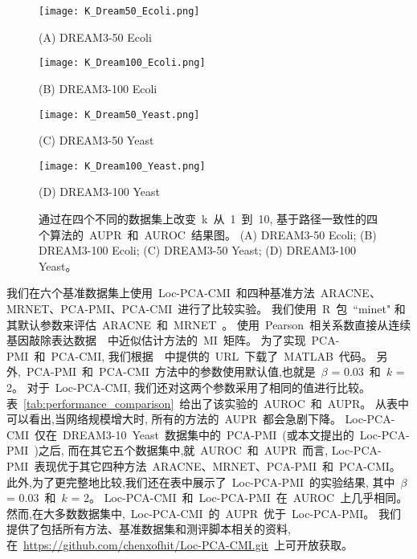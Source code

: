   \begin{figure*}[!htbp]
    \centering
    \begin{minipage}[b]{0.45\linewidth}
      \centering
      \centerline{
        \texttt{[image: K\_Dream50\_Ecoli.png]}}
      \centerline{(A) DREAM3-50 Ecoli}
      \medskip  
    \end{minipage}
    \begin{minipage}[b]{0.45\linewidth}
      \centering
      \centerline{
        \texttt{[image: K\_Dream100\_Ecoli.png]}}
      \centerline{(B) DREAM3-100 Ecoli}
      \medskip  
    \end{minipage}
      \begin{minipage}[b]{0.45\linewidth}
      \centering
      \centerline{
        \texttt{[image: K\_Dream50\_Yeast.png]}}
      \centerline{(C) DREAM3-50 Yeast}
      \medskip  
    \end{minipage}
    \begin{minipage}[b]{0.45\linewidth}
      \centering
      \centerline{
        \texttt{[image: K\_Dream100\_Yeast.png]}}
      \centerline{(D) DREAM3-100 Yeast}
      \medskip  
    \end{minipage}
    \caption{%
    通过在四个不同的数据集上改变~k~从~1~到~10, 基于路径一致性的四个算法的~AUPR~和~AUROC~结果图。
    (A) DREAM3-50 Ecoli; 
    (B) DREAM3-100 Ecoli; 
    (C) DREAM3-50 Yeast; 
    (D) DREAM3-100 Yeast。}


    \label{fig:k}
    \vspace{-0.5em}
  \end{figure*}

我们在六个基准数据集上使用~Loc-PCA-CMI~和四种基准方法~ARACNE、MRNET、PCA-PMI、PCA-CMI~进行了比较实验。
我们使用~R~包~``minet" 和其默认参数来评估~ARACNE~和~MRNET~\cite{meyer2008minet}。
使用~Pearson~相关系数直接从连续基因敲除表达数据~\cite{olsen2008impact,meyer2010information}~中近似估计方法的~MI~矩阵。
为了实现~PCA-PMI~和~PCA-CMI, 我们根据~\cite{zhang2011inferring,zhao2016part}~中提供的~URL~下载了~MATLAB~代码。
另外,~PCA-PMI~和~PCA-CMI~方法中的参数使用默认值,也就是~$\beta$ = 0.03~和~$k$ = 2。
对于~Loc-PCA-CMI, 我们还对这两个参数采用了相同的值进行比较。
表~\ref{tab:performance_comparison}~给出了该实验的~AUROC~和~AUPR。
从表中可以看出,当网络规模增大时, 所有的方法的~AUPR~都会急剧下降。
Loc-PCA-CMI~仅在~DREAM3-10~Yeast~数据集中的~PCA-PMI~(或本文提出的~Loc-PCA-PMI~)之后,
而在其它五个数据集中,就~AUROC~和~AUPR~而言,
Loc-PCA-PMI~表现优于其它四种方法~ARACNE、MRNET、PCA-PMI~和~PCA-CMI。
此外,为了更完整地比较,我们还在表中展示了~Loc-PCA-PMI~的实验结果,
其中~$\beta$ = 0.03~和~$k$ = 2。
Loc-PCA-CMI~和~Loc-PCA-PMI~在~AUROC~上几乎相同。
然而,在大多数数据集中,~Loc-PCA-CMI~的~AUPR~优于~Loc-PCA-PMI。
我们提供了包括所有方法、基准数据集和测评脚本相关的资料, 
在~\url{https://github.com/chenxofhit/Loc-PCA-CMI.git}~上可开放获取。

